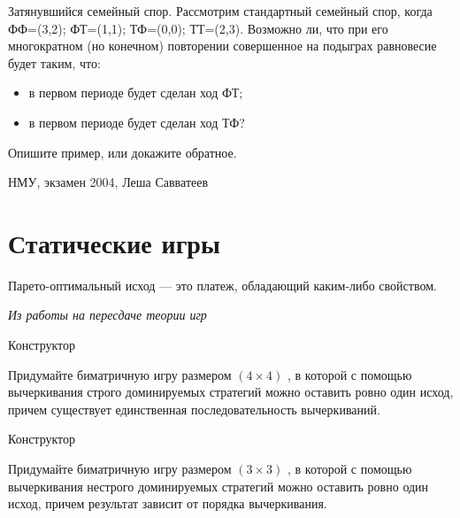 \begin{problem}

Затянувшийся семейный спор. Рассмотрим стандартный семейный спор, когда ФФ=(3,2); ФТ=(1,1); ТФ=(0,0); ТТ=(2,3). Возможно ли, что при его многократном (но конечном) повторении совершенное на подыграх равновесие будет таким, что:
\begin{itemize}
\item в первом периоде будет сделан ход ФТ;
\item в первом периоде будет сделан ход ТФ?
\end{itemize}
Опишите пример, или докажите обратное.



\begin{source}
НМУ, экзамен 2004, Леша Савватеев
\end{source}


\begin{sol}

\end{sol}
\end{problem}







\section{Статические игры} %

Парето-оптимальный исход — это платеж, обладающий каким-либо свойством.

{\it Из работы на пересдаче теории игр}


\begin{problem}
 Конструктор \par
Придумайте биматричную игру размером  $\left(4\times 4\right)$ , в которой с помощью вычеркивания строго доминируемых стратегий можно оставить ровно один исход, причем существует единственная последовательность вычеркиваний.



\begin{sol}

\end{sol}
\end{problem}



\begin{problem}
 Конструктор\par
Придумайте биматричную игру размером  $\left(3\times 3\right)$ , в которой с помощью вычеркивания нестрого доминируемых стратегий можно оставить ровно один исход, причем результат зависит от порядка вычеркивания.\par



\begin{sol}

\end{sol}
\end{problem}



